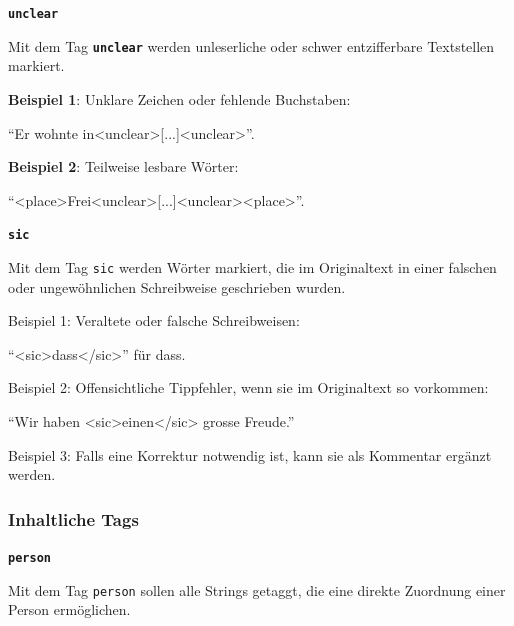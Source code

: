 \documentclass[12pt, a4paper, ngerman, bidi=default]{article}
\begin{document}
\begin{description}
\begin{description}
    
    \item \textbf{\colorbox{unclear}{\texttt{unclear}}}
    

    Mit dem Tag \texttt{\texttt{\textbf{{\colorbox{unclear}{unclear}}}}} werden unleserliche oder schwer entzifferbare Textstellen markiert. 

    
    \noindent\textbf{ Beispiel 1}: Unklare Zeichen oder fehlende Buchstaben: 

    \colorbox{VeryLightGray}{\enquote{Er wohnte in\textless unclear\textgreater [...]\textless unclear\textgreater}.}

    \textbf{ Beispiel 2}: Teilweise lesbare Wörter:

    \colorbox{VeryLightGray}{\enquote{{\textless place\textgreater Frei\textless unclear\textgreater [...]\textless unclear\textgreater \textless place\textgreater}}.}
    
    \item\texttt{\textbf{{\colorbox{sic}{sic}}}} 

    Mit dem Tag \texttt{sic} werden Wörter markiert, die im Originaltext in einer falschen oder ungewöhnlichen Schreibweise geschrieben wurden. 
    
    \noindent{} Beispiel 1: Veraltete oder falsche Schreibweisen: 

    \colorbox{VeryLightGray}{\enquote{{<sic>dass</sic>}} für dass.}

     Beispiel 2: Offensichtliche Tippfehler, wenn sie im Originaltext so vorkommen: 

    \colorbox{VeryLightGray}{\enquote{Wir haben {<sic>einen</sic>} grosse Freude.}}

     Beispiel 3: Falls eine Korrektur notwendig ist, kann sie als Kommentar ergänzt werden. 

    \end{description}

    \subsubsection{Inhaltliche Tags}
    \begin{description}
    \item\texttt{\textbf{{\colorbox{person}{person}}}}
        
    Mit dem Tag \texttt{\colorbox{person}{person}} sollen alle Strings getaggt, die eine direkte Zuordnung einer Person ermöglichen.
    

\end{description}
\end{description}
\end{document}
